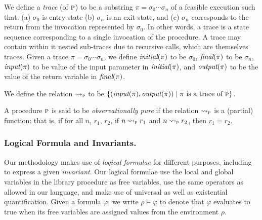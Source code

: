 We define a \emph{trace} (of $\textsc{p}$) to be a substring 
 $\pi = \sigma_0 \cdots \sigma_n$ of a feasible execution such that:
 (a) $\sigma_0$ is entry-state
 (b) $\sigma_n$ is an exit-state, and
 (c) $\sigma_n$ corresponds to the return from the invocation represented
by $\sigma_0$.
In other words, a trace is a state sequence corresponding to a single
invocation of the procedure. A trace may contain within it nested
sub-traces due to recursive calls, which are themselves traces.
Given a trace $\pi = \sigma_0 \cdots \sigma_n$, we define
$\textit{initial}(\pi)$ to be $\sigma_0$,
$\textit{final}(\pi)$ to be $\sigma_n$,
$\textit{input}(\pi)$ to be value of the input parameter in $\textit{initial}(\pi)$,
and $\textit{output}(\pi)$ to be the value of the return variable in $\textit{final}(\pi)$.



We define the relation $\rightsquigarrow_{\textsc{p}}$ to be $\{ (\textit{input}(\pi),\textit{output}(\pi)) \; | \; \pi \text{ is a trace of } \textsc{p} \}$.

\begin{definition}
\label{def:purity}
A procedure $\textsc{p}$ is said to be \emph{observationally pure} if the relation $\rightsquigarrow_{\textsc{p}}$ is a (partial) function:
that is, if for all $n$, $r_1$, $r_2$, if  $n \rightsquigarrow_{\textsc{p}} r_1$ and $n \rightsquigarrow_{\textsc{p}} r_2$, then $r_1 = r_2$.
\end{definition}

\subsubsection{Logical Formula and Invariants.}

Our methodology makes use of \emph{logical formulae} for different
purposes, including to express a given \emph{invariant}. 
Our logical formulae use the local and global variables in the library
procedure as free variables, use
the same operators as allowed in our language, and make use of universal as
well as existential quantification. 
Given a formula $\varphi$, 
we write $\rho \models \varphi$
to denote that $\varphi$ evaluates to true when its free variables are
assigned values from the environment $\rho$.

